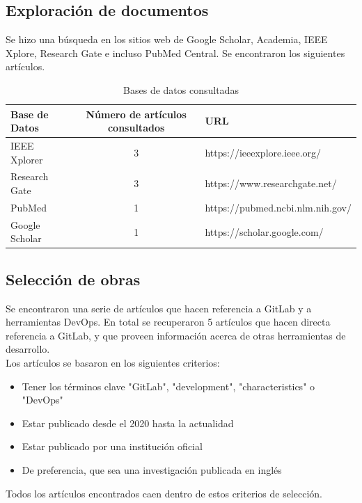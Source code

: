 \documentclass[runningheads]{llncs}
\begin{document}
\subsection{Exploración de documentos}
Se hizo una búsqueda en los sitios web de Google Scholar, Academia, IEEE Xplore, Research Gate e incluso PubMed Central.
Se encontraron los siguientes artículos.
\begin{table}[ht!]
        \centering
        \caption{Bases de datos consultadas}
        \begin{tabular}{l | c | l}
                Base de Datos & Número de artículos consultados & URL \\
                \hline
                \hline
                IEEE Xplorer & 3 & https://ieeexplore.ieee.org/ \\
                Research Gate & 3 & https://www.researchgate.net/ \\
                PubMed & 1 & https://pubmed.ncbi.nlm.nih.gov/ \\
                Google Scholar & 1 & https://scholar.google.com/ \\
                \hline
        \end{tabular}
        \label{table:1}
\end{table}
\subsection{Selección de obras}
Se encontraron una serie de artículos que hacen referencia a GitLab y a herramientas DevOps. En total se
recuperaron 5 artículos que hacen directa referencia a GitLab, y que proveen información acerca de otras
herramientas de desarrollo.\\
Los artículos se basaron en los siguientes criterios:
\begin{itemize}
        \item Tener los términos clave "GitLab", "development", "characteristics" o "DevOps"
        \item Estar publicado desde el 2020 hasta la actualidad
        \item Estar publicado por una institución oficial
        \item De preferencia, que sea una investigación publicada en inglés
\end{itemize}
Todos los artículos encontrados caen dentro de estos criterios de selección.
\end{document}
